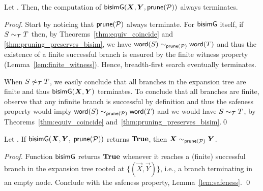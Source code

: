 \begin{lemma}[Termination]
  \label{lem:termination}
  Let \grmcontext. Then, the computation of $\Bisim(\vec X,\vec Y, \Prune(\productions))$
  always terminates.
\end{lemma}
%
\begin{proof}
  Start by noticing that $\mathsf{prune}(\mathcal P)$ always terminate.
  For $\mathsf{bisimG}$ itself, if $S\sim_\mathcal T T$ then, by
  Theorems~\ref{thm:equiv_coincide} and
  \ref{thm:pruning_preserves_bisim}, we have
  $\mathsf{word}(S) \sim_{\mathsf{prune}(\mathcal P)} \mathsf{word}(T) $ and thus the
  existence of a finite successful branch is ensured by the finite
  witness property (Lemma~\ref{lem:finite_witness}).  Hence,
  breadth-first search eventually terminates.
  
  When $S\not\sim_\mathcal T T$, we easily conclude that all branches in
  the expansion tree are finite and thus $\Bisim(\vec X,\vec Y)$
  terminates.  To conclude that all branches are finite, observe that
  any infinite branch is successful by definition and thus the
  safeness property would imply $\mathsf{word}(S) \sim_{\mathsf{prune}(\mathcal P)} \mathsf{word}(T)$ 
  and we would have
  $S\sim_\mathcal T T$, by Theorems~\ref{thm:equiv_coincide}
  and~\ref{thm:pruning_preserves_bisim}.\qed
\end{proof}


\begin{lemma}
  \label{lem:bisimilar-to-prod}
  \begin{sloppypar}
  	Let \grmcontext.  If 
  $\Bisim(\vec X,\vec Y,$ $ \mathsf{prune}(\mathcal P))$ returns $\mathbf{True}$, then
  $\vec X \sim_{\Prune(\productions)} \vec Y$.
  \end{sloppypar}
\end{lemma}

\begin{proof}
  Function $\mathsf{bisimG}$ returns $\mathbf{True}$ whenever it reaches a (finite)
  successful branch in the expansion tree rooted at
  $\{(\vec X,\vec Y)\}$, i.e., a branch terminating in an empty node. 
  Conclude with the safeness property,
  Lemma~\ref{lem:safeness}. \qed
\end{proof}

